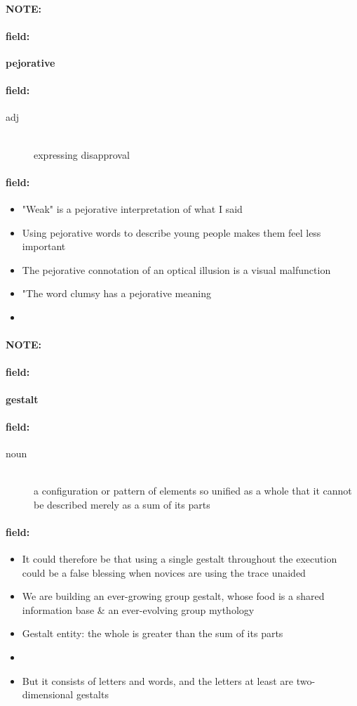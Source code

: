 \documentclass[12pt]{article}
\newenvironment{note}{\paragraph{NOTE:}}{}
\newenvironment{field}{\paragraph{field:}}{}
\begin{document}
\begin{note}
\begin{field}
\textbf{\large pejorative}
\end{field}


\begin{field}
\begin{description}
\item[adj] \hfill \\ 
expressing disapproval

\end{description}
\end{field}

\begin{field}
\begin{itemize}
\item "Weak" is a pejorative interpretation of what I said
\item Using pejorative words to describe young people makes them feel less important
\item The pejorative connotation of an optical illusion is a visual malfunction
\item "The word clumsy has a pejorative meaning
\item 
\end{itemize}
\end{field}
\end{note}
\begin{note}
\begin{field}
\textbf{\large gestalt}
\end{field}


\begin{field}
\begin{description}
\item[noun] \hfill \\ 
a configuration or pattern of elements so unified as a whole that it cannot be described merely as a sum of its parts

\end{description}
\end{field}

\begin{field}
\begin{itemize}
\item It could therefore be that using a single gestalt throughout the execution could be a false blessing when novices are using the trace unaided
\item We are building an ever-growing group gestalt, whose food is a shared information base & an ever-evolving group mythology
\item Gestalt entity: the whole is greater than the sum of its parts
\item 
\item But it consists of letters and words, and the letters at least are two-dimensional gestalts
\end{itemize}
\end{field}
\end{note}
\end{document}
